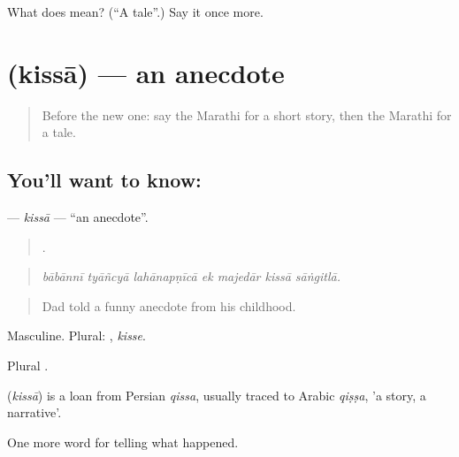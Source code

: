 \begin{tcolorbox}[breakable,colback=teal!4,colframe=teal!35!black,title={Before you move on}]
What does  mean? (\textquotedblleft{}A tale\textquotedblright{}.) Say it once more.
\end{tcolorbox}
\section[\texorpdfstring{\mr{किस्सा} (kissā)}{किस्सा (kissā)}]{ (kissā) — an anecdote}

\label{lesson:MR-C303-kissa}



\begin{quote}
Before the new one: say the Marathi for a short story, then the Marathi for a tale.
\end{quote}

\subsection*{You'll want to know: }
\textbf{} — \emph{kissā} — \textquotedblleft{}an anecdote\textquotedblright{}.

\begin{quote}
      .
\end{quote}

\begin{quote}
\emph{bābānnī tyāñcyā lahānapṇīcā ek majedār kissā sāṅgitlā.}
\end{quote}

\begin{quote}
Dad told a funny anecdote from his childhood.
\end{quote}

Masculine. Plural: , \emph{kisse}.

Plural .

\begin{cousinweb}
\textbf{} (\emph{kissā}) is a loan from Persian \emph{qissa}, usually traced to Arabic \emph{qiṣṣa}, 'a story, a narrative'.
\end{cousinweb}

\begin{grammarlens}[title={What you've built}]
One more word for telling what happened.
\end{grammarlens}


